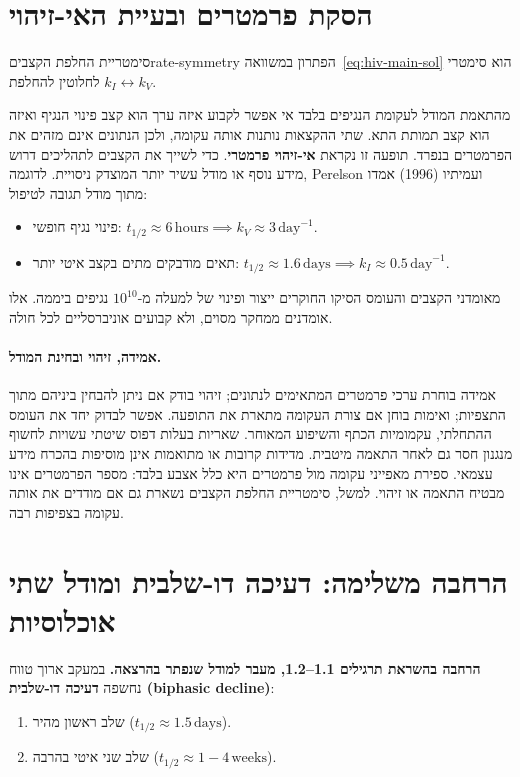 \section{הסקת פרמטרים ובעיית האי-זיהוי}\label{sec:identifiability}

\begin{theorem}{סימטריית החלפת הקצבים}{rate-symmetry}
הפתרון במשוואה~\eqref{eq:hiv-main-sol} הוא סימטרי לחלוטין להחלפת $k_I \leftrightarrow k_V$.
\end{theorem}

\begin{remark}
מהתאמת המודל לעקומת הנגיפים בלבד אי אפשר לקבוע איזה ערך הוא קצב פינוי הנגיף ואיזה הוא קצב תמותת התא. שתי ההקצאות נותנות אותה עקומה, ולכן הנתונים אינם מזהים את הפרמטרים בנפרד. תופעה זו נקראת \textbf{אי-זיהוי פרמטרי}.
כדי לשייך את הקצבים לתהליכים דרוש מידע נוסף או מודל עשיר יותר המוצדק ניסויית. לדוגמה, Perelson ועמיתיו (1996) אמדו מתוך מודל תגובה לטיפול:
\begin{itemize}
\item פינוי נגיף חופשי: $t_{1/2} \approx 6\,\text{hours} \implies k_V \approx 3\,\text{day}^{-1}$.
\item תאים מודבקים מתים בקצב איטי יותר: $t_{1/2} \approx 1.6\,\text{days} \implies k_I \approx 0.5\,\text{day}^{-1}$.
\end{itemize}
מאומדני הקצבים והעומס הסיקו החוקרים ייצור ופינוי של למעלה מ-$10^{10}$ נגיפים ביממה.
אלו אומדנים ממחקר מסוים, ולא קבועים אוניברסליים לכל חולה.
\end{remark}

\paragraph{אמידה, זיהוי ובחינת המודל.}
אמידה בוחרת ערכי פרמטרים המתאימים לנתונים; זיהוי בודק אם ניתן להבחין ביניהם מתוך התצפיות; ואימות בוחן אם צורת העקומה מתארת את התופעה. אפשר לבדוק יחד את העומס ההתחלתי, עקמומיות הכתף והשיפוע המאוחר. שאריות בעלות דפוס שיטתי עשויות לחשוף מנגנון חסר גם לאחר התאמה מיטבית. מדידות קרובות או מתואמות אינן מוסיפות בהכרח מידע עצמאי. ספירת מאפייני עקומה מול פרמטרים היא כלל אצבע בלבד: מספר הפרמטרים אינו מבטיח התאמה או זיהוי. למשל, סימטריית החלפת הקצבים נשארת גם אם מודדים את אותה עקומה בצפיפות רבה.

\section{הרחבה משלימה: דעיכה דו-שלבית ומודל שתי אוכלוסיות}\label{sec:hiv-biphasic}
\textbf{הרחבה בהשראת תרגילים 1.1--1.2, מעבר למודל שנפתר בהרצאה.}
במעקב ארוך טווח נחשפה \textbf{דעיכה דו-שלבית (\textenglish{biphasic decline})}:
\begin{enumerate}
\item שלב ראשון מהיר ($t_{1/2} \approx 1.5\,\text{days}$).
\item שלב שני איטי בהרבה ($t_{1/2} \approx 1-4\,\text{weeks}$).
\end{enumerate}

